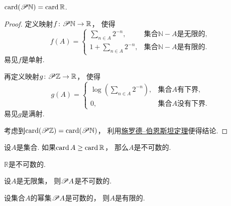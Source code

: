 \begin{proposition}
\(\operatorname{card}(\mathscr{P}\mathbb{N}) = \operatorname{card}\mathbb{R}\).
\begin{proof}
定义映射\(f\colon \mathscr{P}\mathbb{N}\to\mathbb{R}\)，
使得\begin{equation*}
	f(A) = \left\{ \begin{array}{cl}
		\sum_{n \in A} 2^{-n}, & \text{集合$\mathbb{N}-A$是无限的}, \\
		1 + \sum_{n \in A} 2^{-n}, & \text{集合$\mathbb{N}-A$是有限的}.
	\end{array} \right.
\end{equation*}
易见\(f\)是单射.

再定义映射\(g\colon \mathscr{P}\mathbb{Z}\to\mathbb{R}\)，
使得\begin{equation*}
	g(A) = \left\{ \begin{array}{cl}
		\log\left(\sum_{n \in A} 2^{-n}\right), & \text{集合$A$有下界}, \\
		0, & \text{集合$A$没有下界}.
	\end{array} \right.
\end{equation*}
易见\(g\)是满射.

考虑到\(\operatorname{card}(\mathscr{P}\mathbb{Z}) = \operatorname{card}(\mathscr{P}\mathbb{N})\)，
利用\hyperref[theorem:集合论.施罗德--伯恩斯坦定理]{施罗德--伯恩斯坦定理}便得结论.
\end{proof}
\end{proposition}

\begin{corollary}
设\(A\)是集合.
如果\(\operatorname{card} A \geq \operatorname{card}\mathbb{R}\)，
那么\(A\)是不可数的.
\end{corollary}

\begin{theorem}
\(\mathbb{R}\)是不可数的.
\end{theorem}

\begin{proposition}
设\(A\)是无限集，
则\(\mathscr{P} A\)是不可数的.
\end{proposition}
\begin{corollary}
设集合\(A\)的幂集\(\mathscr{P} A\)是可数的，
则\(A\)是有限的.
\end{corollary}

